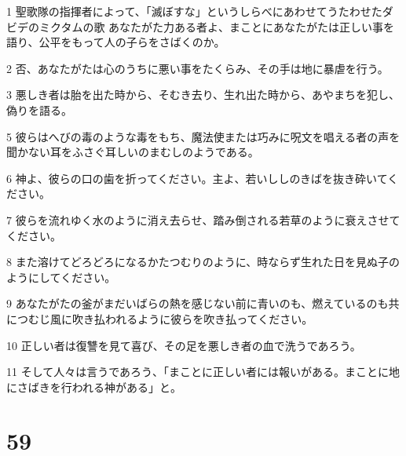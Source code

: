 \par 1 聖歌隊の指揮者によって、「滅ぼすな」というしらべにあわせてうたわせたダビデのミクタムの歌 あなたがた力ある者よ、まことにあなたがたは正しい事を語り、公平をもって人の子らをさばくのか。
\par 2 否、あなたがたは心のうちに悪い事をたくらみ、その手は地に暴虐を行う。
\par 3 悪しき者は胎を出た時から、そむき去り、生れ出た時から、あやまちを犯し、偽りを語る。
\par 5 彼らはへびの毒のような毒をもち、魔法使または巧みに呪文を唱える者の声を聞かない耳をふさぐ耳しいのまむしのようである。
\par 6 神よ、彼らの口の歯を折ってください。主よ、若いししのきばを抜き砕いてください。
\par 7 彼らを流れゆく水のように消え去らせ、踏み倒される若草のように衰えさせてください。
\par 8 また溶けてどろどろになるかたつむりのように、時ならず生れた日を見ぬ子のようにしてください。
\par 9 あなたがたの釜がまだいばらの熱を感じない前に青いのも、燃えているのも共につむじ風に吹き払われるように彼らを吹き払ってください。
\par 10 正しい者は復讐を見て喜び、その足を悪しき者の血で洗うであろう。
\par 11 そして人々は言うであろう、「まことに正しい者には報いがある。まことに地にさばきを行われる神がある」と。

\chapter{59}

